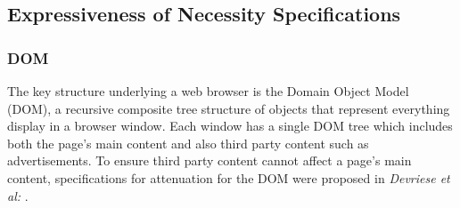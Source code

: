 \subsection{Expressiveness of Necessity Specifications}



\subsubsection{DOM}
\label{ss:DOM}

The key structure underlying a web browser is the Domain Object Model
(DOM), a recursive composite tree structure of objects that represent
everything display in a browser window.  Each window has a single DOM
tree which includes both the page's main content and also third party
content such as advertisements. To ensure third party content cannot
affect a page's main content,
specifications for attenuation for the DOM were proposed in
\textit{Devriese et al:}   \cite{dd}. 

